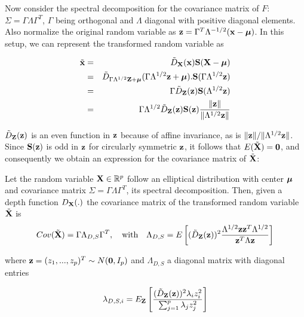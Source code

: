 \documentclass[fleqn,11pt]{article}
\begin{document}
Now consider the spectral decomposition for the covariance matrix of $F$: $\Sigma = \Gamma\Lambda\Gamma^T$, $\Gamma$ being orthogonal and $\Lambda$ diagonal with positive diagonal elements. Also normalize the original random variable as ${\bf{z}} = \Gamma^T\Lambda^{-1/2} ({\bf{x}} - {\boldsymbol{\mu}})$. In this setup, we can represent the transformed random variable as

\begin{eqnarray}
\tilde {{\bf{x}}} &=& \tilde D_{{\mathbf{X}}} ({\bf{x}}) {\mathbf{S}}({\mathbf{X}} - {\boldsymbol{\mu}}) \notag \\
&=& \tilde D_{\Gamma\Lambda^{1/2}{\mathbf{Z}} + {\boldsymbol{\mu}}} (\Gamma\Lambda^{1/2} {\bf{z}} + {\boldsymbol{\mu}}). {\mathbf{S}}(\Gamma\Lambda^{1/2} {\bf{z}}) \notag \\
&=& \Gamma \tilde D_{{\mathbf{Z}}}({\bf{z}}) {\mathbf{S}}(\Lambda^{1/2}{\bf{z}}) \notag \\
&=& \Gamma \Lambda^{1/2} \tilde D_{{\mathbf{Z}}}({\bf{z}}) {\mathbf{S}}({\bf{z}}) \frac{\| {\bf{z}} \|}{\|\Lambda^{1/2} {\bf{z}}\|}
\label{equation:rankdecomp}
\end{eqnarray}


$\tilde D_{\mathbf{Z}}({\bf{z}})$ is an even function in ${\bf{z}}$ because of affine invariance, as is $\| {\bf{z}} \| / \|\Lambda^{1/2} {\bf{z}} \|$. Since ${\mathbf{S}}({\bf{z}})$ is odd in ${\bf{z}}$ for circularly symmetric ${\bf{z}}$, it follows that $E(\tilde {{\mathbf{X}}}) = \bf0$, and consequently we obtain an expression for the covariance matrix of $\tilde {{\mathbf{X}}}$:

\begin{Theorem} \label{Theorem:covform}
Let the random variable ${\mathbf{X}} \in \mathbb{R}^p$ follow an elliptical distribution with center ${\boldsymbol{\mu}}$ and covariance matrix $\Sigma = \Gamma\Lambda\Gamma^T$, its spectral decomposition. Then, given a depth function $D_{\mathbf{X}}(.)$ the covariance matrix of the transformed random variable $\tilde{{\mathbf{X}}}$ is
\begin{equation} \label{equation:covformEq1}
Cov(\tilde {{\mathbf{X}}}) = \Gamma \Lambda_{D,S} \Gamma^T,\quad\mbox{with}\quad \Lambda_{D,S} = E \left[ (\tilde D_{\mathbf{Z}}({\bf{z}}))^2 \frac{\Lambda^{1/2} {\bf{z}} {\bf{z}}^T \Lambda^{1/2}}{{\bf{z}}^T \Lambda {\bf{z}}} \right]
\end{equation}

where ${\bf{z}} = (z_1,...,z_p)^T \sim N({\bf 0}, I_p)$ and $\Lambda_{D,S}$ a diagonal matrix with diagonal entries

$$ \lambda_{D,S,i} = E_{\mathbf{Z}} \left[ \frac{(\tilde D_{\mathbf{Z}}({\bf{z}}))^2 \lambda_i z_i^2}{\sum_{j=1}^p \lambda_j z_j^2} \right] $$
\end{Theorem}
\end{document}
